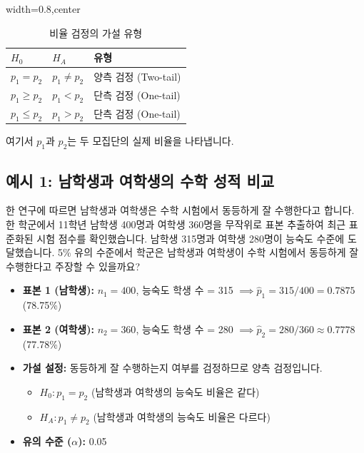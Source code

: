 \documentclass[11pt,a4paper]{article}
\theoremstyle{definition}
\begin{document}
\begin{table}[h!]
\caption{비율 검정의 가설 유형}
\label{tab:proportion_hypotheses}
\centering
\begin{adjustbox}{width=0.8\textwidth,center}
\begin{tabular}{lll}
\toprule
\textbf{$H_0$} & \textbf{$H_A$} & \textbf{유형} \\
\midrule
$p_1 = p_2$ & $p_1 \ne p_2$ & 양측 검정 (Two-tail) \\
$p_1 \ge p_2$ & $p_1 < p_2$ & 단측 검정 (One-tail) \\
$p_1 \le p_2$ & $p_1 > p_2$ & 단측 검정 (One-tail) \\
\bottomrule
\end{tabular}
\end{adjustbox}
\end{table}
여기서 $p_1$과 $p_2$는 두 모집단의 실제 비율을 나타냅니다.

\subsection{예시 1: 남학생과 여학생의 수학 성적 비교}
\begin{examplebox}[title=시나리오:]
한 연구에 따르면 남학생과 여학생은 수학 시험에서 동등하게 잘 수행한다고 합니다. 한 학군에서 11학년 남학생 400명과 여학생 360명을 무작위로 표본 추출하여 최근 표준화된 시험 점수를 확인했습니다. 남학생 315명과 여학생 280명이 능숙도 수준에 도달했습니다. 5\% 유의 수준에서 학군은 남학생과 여학생이 수학 시험에서 동등하게 잘 수행한다고 주장할 수 있을까요?
\end{examplebox}

\begin{itemize}
    \item \textbf{표본 1 (남학생):} $n_1 = 400$, 능숙도 학생 수 = 315 $\implies \hat{p}_1 = 315/400 = 0.7875$ (78.75\%)
    \item \textbf{표본 2 (여학생):} $n_2 = 360$, 능숙도 학생 수 = 280 $\implies \hat{p}_2 = 280/360 \approx 0.7778$ (77.78\%)
    \item \textbf{가설 설정:} 동등하게 잘 수행하는지 여부를 검정하므로 양측 검정입니다.
    \begin{itemize}
        \item $H_0: p_1 = p_2$ (남학생과 여학생의 능숙도 비율은 같다)
        \item $H_A: p_1 \ne p_2$ (남학생과 여학생의 능숙도 비율은 다르다)
    \end{itemize}
    \item \textbf{유의 수준 ($\alpha$):} 0.05
\end{itemize}
\end{document}
